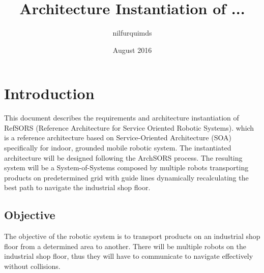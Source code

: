 \documentclass{article}
\title{Architecture Instantiation of ...}
\author{nilfurquimds}
\date{August 2016}
\begin{document}
\maketitle

\section*{Introduction}
This document describes the requirements and architecture instantiation of RefSORS (Reference Architecture for Service Oriented Robotic Systems). which is a reference architecture based on Service-Oriented Architecture (SOA) specifically for indoor, grounded mobile robotic system. The instantiated architecture will be designed following the ArchSORS process. The resulting system will be a System-of-Systems composed by multiple robots transporting products on predetermined grid with guide lines dynamically recalculating the best path to navigate the industrial shop floor.

\subsection*{Objective}
The objective of the robotic system is to transport products on an industrial shop floor from a determined area to another. There will be multiple robots on the industrial shop floor, thus they will have to communicate to navigate effectively without collisions.







\end{document}
